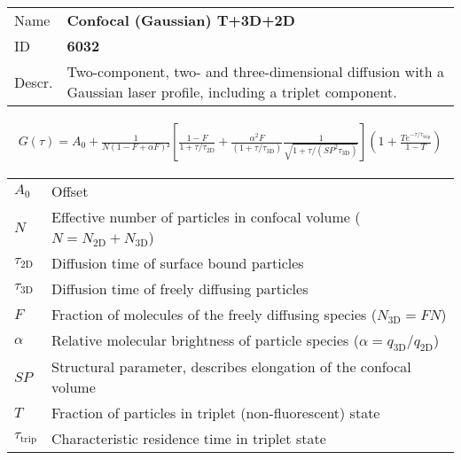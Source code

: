 \noindent \begin{tabular}{lp{}}
Name & \textbf{Confocal (Gaussian) T+3D+2D} \\ 
ID & \textbf{6032} \\ 
Descr. &  Two-component, two- and three-dimensional diffusion with a Gaussian laser profile, including a triplet component\cite{Elson1974, Aragon1976, Palmer1987, Thomps:bookFCS2002}. \\ 
\end{tabular}
\begin{align}
G(\tau) = A_0 + \frac{1}{N (1 - F + \alpha F)²} \left[ \frac{1-F}{1+\tau/\tau_\mathrm{2D}} + \frac{ \alpha^2 F}{ (1+\tau/\tau_\mathrm{3D}) } \frac{1}{\sqrt{1+\tau/(\mathit{SP}^2 \tau_\mathrm{3D})}} \right] \left(1 + \frac{T e^{-\tau/\tau_\mathrm{trip}}}{1-T}  \right) 
\end{align} 
\begin{center}
\begin{tabular}{ll}
$A_0$ & Offset \\ 
$N$ & Effective number of particles in confocal volume ($N = N_\mathrm{2D}+N_\mathrm{3D}$) \\ 
$\tau_\mathrm{2D}$ &  Diffusion time of surface bound particles \\ 
$\tau_\mathrm{3D}$ &  Diffusion time of freely diffusing particles \\ 
$F$ & Fraction of molecules of the freely diffusing species ($N_\mathrm{3D} = F N$) \\
$\alpha$ & Relative molecular brightness of particle species ($ \alpha = q_\mathrm{3D}/q_\mathrm{2D}$) \\
$\mathit{SP}$ & Structural parameter, describes elongation of the confocal volume \\
$T$ &  Fraction of particles in triplet (non-fluorescent) state\\ 
$\tau_\mathrm{trip}$ &  Characteristic residence time in triplet state \\ 
\end{tabular}
\end{center}
\vspace{2em}


